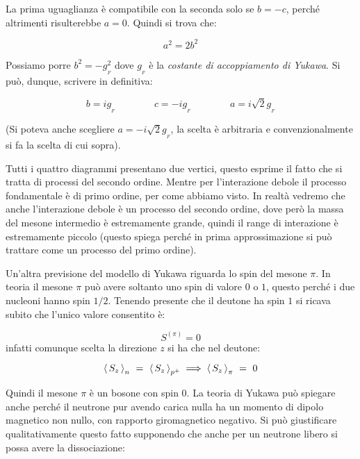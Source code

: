 La prima uguaglianza è compatibile con la seconda solo se $b = -c$, perché
altrimenti risulterebbe $a = 0$. Quindi si trova che:

\begin{equation*}
a^2=2b^2
\end{equation*}

Possiamo porre $b^2 = - g^2_{_{F}}$ dove $g_{_{F}}$ è la \textit{costante di
accoppiamento di Yukawa}.
Si può, dunque, scrivere in definitiva:

\begin{equation*}
b= i g_{_{F}} \qquad \qquad  c = - i g_{_{F}} \qquad \qquad a = i \sqrt{2}  
g_{_{F}}
\end{equation*}

(Si poteva anche scegliere $ a = - i \sqrt{2}  g_{_{F}}$, la scelta è 
arbitraria
e convenzionalmente si fa la scelta di cui sopra).

Tutti i quattro diagrammi presentano due vertici, questo esprime il fatto che si
tratta di processi del secondo ordine. Mentre per l'interazione debole il
processo fondamentale è di primo ordine, per come abbiamo visto. In realtà
vedremo che anche l'interazione debole è un processo del secondo ordine, dove
però la massa del mesone intermedio è estremamente grande, quindi il range di
interazione è estremamente piccolo (questo spiega perché in prima
approssimazione si può trattare come un processo del primo ordine). 

Un'altra previsione del modello di Yukawa riguarda lo spin del mesone $\pi$. 
In teoria il mesone $\pi$ può avere soltanto uno spin di valore $0$ o $1$,
questo perché i due nucleoni hanno spin $1/2$. Tenendo presente che il deutone
ha spin $1$ si ricava subito che l'unico valore consentito è:

\begin{equation*}
S^{(\pi)} = 0
\end{equation*}
infatti comunque scelta la direzione $z$ si ha che nel deutone:

\begin{equation*}
  \left\langle\, S_z \,\right\rangle_n \ = \ \left\langle\, S_z \,\right\rangle_{p^+} \implies \left\langle\, S_z \,\right\rangle_{\pi} \ = \ 0
\end{equation*}

Quindi il mesone $\pi$ è un bosone con spin 0. 
La teoria di Yukawa può spiegare anche perché il neutrone pur avendo carica
nulla ha un momento di dipolo magnetico non nullo, con rapporto giromagnetico
negativo. Si può giustificare qualitativamente questo fatto supponendo che 
anche
per un neutrone libero si possa avere la dissociazione:

